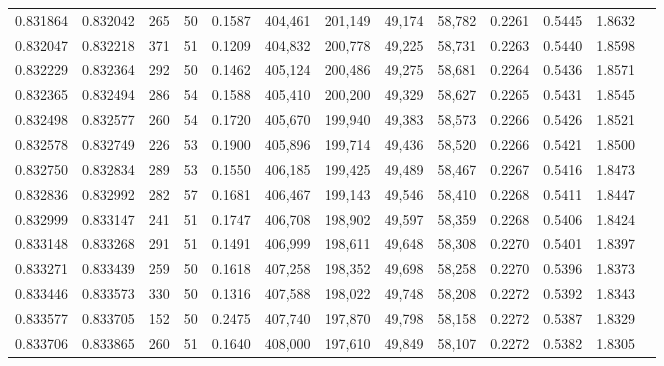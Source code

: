 \begin{tabular}{rrrrrrrrrrrrr}
0.831864 & 0.832042 &   265 &  50 &                                     0.1587 & 404,461 & 201,149 &  49,174 &  58,782 & 0.2261 & 0.5445 & 1.8632 \\
0.832047 & 0.832218 &   371 &  51 &                                     0.1209 & 404,832 & 200,778 &  49,225 &  58,731 & 0.2263 & 0.5440 & 1.8598 \\
0.832229 & 0.832364 &   292 &  50 &                                     0.1462 & 405,124 & 200,486 &  49,275 &  58,681 & 0.2264 & 0.5436 & 1.8571 \\
0.832365 & 0.832494 &   286 &  54 &                                     0.1588 & 405,410 & 200,200 &  49,329 &  58,627 & 0.2265 & 0.5431 & 1.8545 \\
0.832498 & 0.832577 &   260 &  54 &                                     0.1720 & 405,670 & 199,940 &  49,383 &  58,573 & 0.2266 & 0.5426 & 1.8521 \\
0.832578 & 0.832749 &   226 &  53 &                                     0.1900 & 405,896 & 199,714 &  49,436 &  58,520 & 0.2266 & 0.5421 & 1.8500 \\
0.832750 & 0.832834 &   289 &  53 &                                     0.1550 & 406,185 & 199,425 &  49,489 &  58,467 & 0.2267 & 0.5416 & 1.8473 \\
0.832836 & 0.832992 &   282 &  57 &                                     0.1681 & 406,467 & 199,143 &  49,546 &  58,410 & 0.2268 & 0.5411 & 1.8447 \\
0.832999 & 0.833147 &   241 &  51 &                                     0.1747 & 406,708 & 198,902 &  49,597 &  58,359 & 0.2268 & 0.5406 & 1.8424 \\
0.833148 & 0.833268 &   291 &  51 &                                     0.1491 & 406,999 & 198,611 &  49,648 &  58,308 & 0.2270 & 0.5401 & 1.8397 \\
0.833271 & 0.833439 &   259 &  50 &                                     0.1618 & 407,258 & 198,352 &  49,698 &  58,258 & 0.2270 & 0.5396 & 1.8373 \\
0.833446 & 0.833573 &   330 &  50 &                                     0.1316 & 407,588 & 198,022 &  49,748 &  58,208 & 0.2272 & 0.5392 & 1.8343 \\
0.833577 & 0.833705 &   152 &  50 &                                     0.2475 & 407,740 & 197,870 &  49,798 &  58,158 & 0.2272 & 0.5387 & 1.8329 \\
0.833706 & 0.833865 &   260 &  51 &                                     0.1640 & 408,000 & 197,610 &  49,849 &  58,107 & 0.2272 & 0.5382 & 1.8305 \\

\end{tabular}
